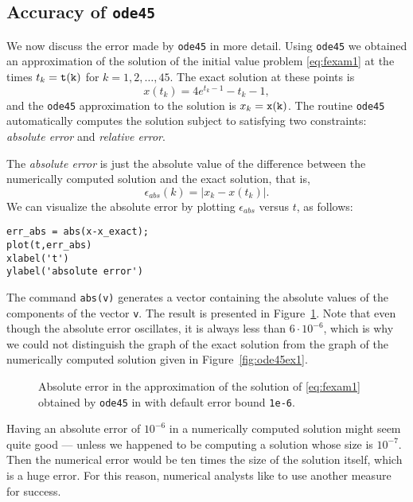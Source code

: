 \documentclass{ximera}
\begin{document}
\subsection*{Accuracy of {\tt ode45}}

We now discuss the error made by {\tt ode45} in more detail.
Using {\tt ode45} we obtained an approximation of the solution of
the initial value problem \eqref{eq:fexam1} at the times $t_k={\tt t(k)}$
for $k=1,2,\ldots,45$.  The exact solution at these points is
\[
x(t_k)=4e^{t_k-1}-t_k-1,
\]
and the {\tt ode45} approximation to the solution is $x_k={\tt x(k)}$.  The 
routine {\tt ode45} automatically computes the solution subject to satisfying 
two constraints: {\em absolute error} and {\em relative error\/}.

The {\em absolute error} is just the absolute value of
the difference between the numerically computed solution and the exact
solution, that is,
\[
\epsilon_{abs}(k) = |x_k - x(t_k)|.
\]
We can visualize the absolute error by plotting $\epsilon_{abs}$ versus $t$, 
as follows:
\begin{verbatim}
err_abs = abs(x-x_exact);
plot(t,err_abs)
xlabel('t')
ylabel('absolute error')
\end{verbatim}
The \Matlab command {\tt abs(v)} generates a vector containing the absolute 
values of the components of the vector {\tt v}.  The result is presented in 
Figure~\ref{fig:ode45err0}.  Note that even though the absolute error 
oscillates, it is always less than $6\cdot10^{-6}$, which is why we could not 
distinguish the graph of the exact solution from the graph of the numerically 
computed solution given in Figure~\ref{fig:ode45ex1}.

\begin{figure}[htb]
   \centerline{%
   }
   \caption{Absolute error in the approximation of the solution of
   \protect\eqref{eq:fexam1} obtained by {\tt ode45} in \protect\Matlab with 
	default error bound {\tt 1e-6}.}
   \label{fig:ode45err0}
\end{figure}

Having an absolute error of $10^{-6}$ in a numerically computed solution might
seem quite good --- unless we happened to be computing a solution whose size 
is $10^{-7}$.  Then the numerical error would be ten times the size of the 
solution itself, which is a huge error.  For this reason, numerical analysts
like to use another measure for success.  
\end{document}

